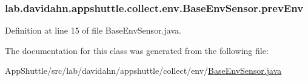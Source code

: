 \hypertarget{classlab_1_1davidahn_1_1appshuttle_1_1collect_1_1env_1_1_base_env_sensor_a6acb3d3703fc547f24051be83d4299e1}{
\subsubsection[{prev\-Env}]{ {\bf lab.\-davidahn.\-appshuttle.\-collect.\-env.\-Base\-Env\-Sensor.\-prev\-Env}}}\label{classlab_1_1davidahn_1_1appshuttle_1_1collect_1_1env_1_1_base_env_sensor_a6acb3d3703fc547f24051be83d4299e1}


\-Definition at line 15 of file \-Base\-Env\-Sensor.\-java.



\-The documentation for this class was generated from the following file\-:\begin{DoxyCompactItemize}
\item 
\-App\-Shuttle/src/lab/davidahn/appshuttle/collect/env/\hyperlink{_base_env_sensor_8java}{\-Base\-Env\-Sensor.\-java}\end{DoxyCompactItemize}
